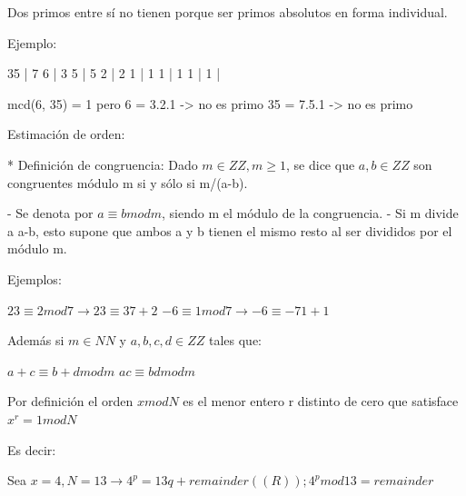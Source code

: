 \documentclass[11pt, spanish]{report}
\begin{document}
Dos primos entre sí no tienen porque ser primos absolutos en forma individual.

Ejemplo:

35 | 7          6 | 3
 5 | 5          2 | 2
 1 | 1          1 | 1
 1 |            1 |

 mcd(6, 35) = 1
 pero 6 = 3.2.1 -> no es primo
 35 = 7.5.1 -> no es primo

 Estimación de orden:

 * Definición de congruencia: Dado $m \in ZZ, m \geq 1$, se dice que $a,b \in ZZ$ son congruentes módulo m si y sólo si m/(a-b).

 - Se denota por $a \equiv b mod m$, siendo m el módulo de la congruencia.
 - Si m divide a a-b, esto supone que ambos a y b tienen el mismo resto al ser divididos por el módulo m.

 Ejemplos:

 $23 \equiv 2 mod 7 \rightarrow 23 \equiv 3 7 + 2$
 $-6 \equiv 1 mod 7 \rightarrow -6 \equiv -7 1 +1$

 Además si $m \in NN$ y $a,b,c,d \in ZZ$ tales que:

 $a+c \equiv b+d mod m$
 $a c \equiv b d mod m$

 Por definición el orden $x mod N$ es el menor entero r distinto de cero que satisface $x^r = 1 mod N$
 
 Es decir:

 Sea $x = 4, N = 13 \rightarrow 4^p = 13 q + remainder ((R)); 4^p mod 13 = remainder$
\end{document}
